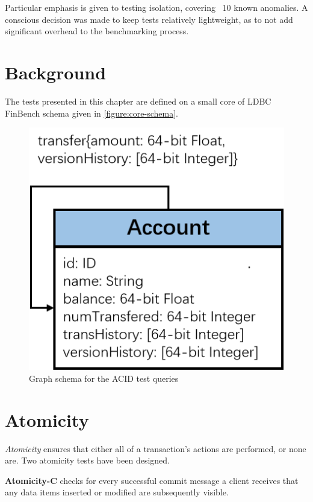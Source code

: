 Particular emphasis is given to testing isolation, covering ~10 known anomalies.
A conscious decision was made to keep tests relatively lightweight, as to not
add significant overhead to the benchmarking process.

\section{Background}

The tests presented in this chapter are defined on a small core of LDBC FinBench
schema given in \autoref{figure:core-schema}.

\begin{figure}[htbp]
  \centering
  \includegraphics[scale=0.5]{figures/acid/acid-schema}
  \caption{Graph schema for the ACID test queries}
  \label{figure:core-schema}
\end{figure}

\begin{figure}[h]
  \centering
  
\end{figure}

\section{Atomicity}

\emph{Atomicity} ensures that either all of a transaction's actions are
performed, or none are. Two atomicity tests have been designed.

  {\flushleft \textbf{Atomicity-C}} checks for every successful commit message a
client receives that any data items inserted or modified are subsequently visible.


